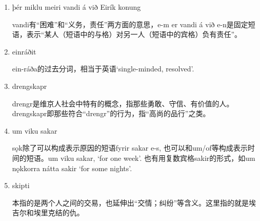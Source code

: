 \begin{grammar*}{}
    \begin{enumerate}[leftmargin=*]
        \item þér miklu meiri vandi á við Eirík konung

              vandi有“困难”和“义务，责任”两方面的意思，e-m er vandi á við e-n是固定短语，表示“某人（短语中的与格）对另一人（短语中的宾格）负有责任”。

        \item einráðit

              ein-ráða的过去分词，相当于英语`single-minded, resolved'.

        \item drengskapr

              drengr是维京人社会中特有的概念，指那些勇敢、守信、有价值的人。drengskapr即那些符合“drengr”的行为，指“高尚的品行”之类。

        \item um viku sakar

              sǫk除了可以构成表示原因的短语fyrir sakar e-s, 也可以和um/of等构成表示时间的短语。um viku sakar, `for one week'. 也有用复数宾格sakir的形式，如um nǫkkorra nátta sakir `for some nights'.

        \item skipti

              本指的是两个人之间的交易，也延伸出“交情；纠纷”等含义。这里指的就是埃吉尔和埃里克结的仇。
    \end{enumerate}
\end{grammar*}
